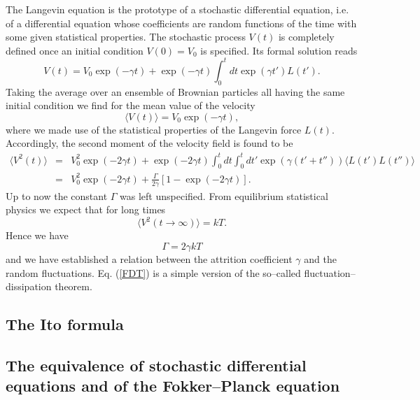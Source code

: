 The Langevin equation is the prototype of a stochastic 
differential equation, i.e. of a differential equation whose
coefficients are random functions of the time with some given
statistical properties. The stochastic process $V(t)$ is 
completely defined once an initial condition $V(0)=V_0$ is specified.
Its formal solution reads
\begin{equation*}
V(t) = V_0 \exp(-\gamma t) + \exp(-\gamma t) 
    \int_0^t dt \exp(\gamma t') L(t').
\end{equation*}
Taking the average over an ensemble of Brownian particles all
having the same initial condition we find for the mean value of 
the velocity
\begin{equation*}
\langle V(t) \rangle = V_0 \exp(-\gamma t),
\end{equation*}
where we made use of the statistical properties of the Langevin 
force $L(t)$. Accordingly, the second moment of the velocity field
is found to be
\begin{eqnarray*}
\langle V^2(t) \rangle &=& V_0^2 \exp(-2\gamma t)
          + \exp(-2 \gamma t) \int_0^t dt \int_0^t dt'
             \exp(\gamma (t' + t'')) \langle L(t') L(t'') \rangle 
             \\
          &=& V_0^2 \exp(-2\gamma t) + \frac{\Gamma}{2 \gamma}
             [1-\exp(-2 \gamma t)].
\end{eqnarray*}
Up to now the constant $\Gamma$ was left unspecified. From 
equilibrium statistical physics we  expect that for long times 
\begin{equation*}
\langle V^2(t\rightarrow \infty) \rangle = kT.
\end{equation*}
Hence we have
\begin{equation}
\label{FDT}
\Gamma = 2 \gamma kT
\end{equation}
and we have established a relation between the attrition 
coefficient $\gamma$ and the random fluctuations.
Eq. (\ref{FDT}) is a simple version of the so--called
fluctuation--dissipation theorem.

\subsection{The Ito formula}




\subsection{The equivalence of stochastic differential equations 
and of the Fokker--Planck equation}


